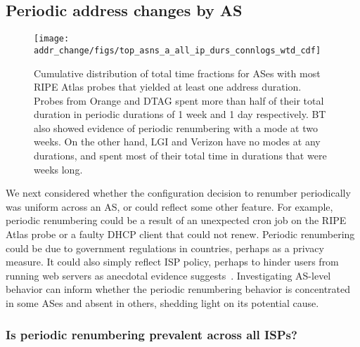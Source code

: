 \subsection{Periodic address changes by AS}
\label{sec:periodic-as}
\begin{figure}[tb]
  \begin{center}
    \texttt{[image: addr\_change/figs/top\_asns\_a\_all\_ip\_durs\_connlogs\_wtd\_cdf]}
  \end{center}
  \caption[Cumulative distribution of total time fraction by AS]{\label{fig:top_asns_all_durs}    
    Cumulative distribution of total time fractions for 
    ASes with most RIPE Atlas probes
    that yielded at least one address duration. Probes from Orange and
    DTAG spent more than half of their total duration in periodic
    durations of 1 week and 1 day respectively. BT also showed evidence
    of periodic renumbering with a mode at two weeks. On the other
    hand, LGI and Verizon have no modes at any durations, and spent
    most of their total time in durations that were weeks long.
  }
\end{figure}

 We next considered whether the configuration decision to
renumber periodically was uniform across an AS, or could
reflect some other feature. For example, periodic
renumbering could be a result of an unexpected
cron job on the RIPE Atlas probe or a faulty DHCP client that
could not renew. Periodic renumbering could be due to government
regulations in countries, perhaps as a privacy measure. It could also
simply reflect ISP policy, perhaps to hinder users from running web servers as anecdotal
evidence suggests~\cite{forcedseparation}.  %
Investigating AS-level behavior can inform whether the periodic renumbering
behavior is concentrated in some ASes and absent in others, shedding light on its potential cause.


\subsubsection{Is periodic renumbering prevalent across all ISPs?}

